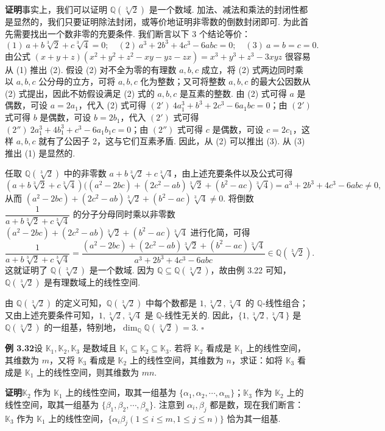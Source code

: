 \documentclass[UTF8,12pt,a4paper,fontset=fandol]{ctexart}
\begin{document}
\noindent\textbf{证明}\quad 事实上，我们可以证明 $\mathbb{Q}(\sqrt[3]{2})$ 是一个数域. 加法、减法和乘法的封闭性都是显然的，我们只要证明除法封闭，或等价地证明非零数的倒数封闭即可. 为此首先需要找出一个数非零的充要条件. 我们断言以下 3 个结论等价：
\[
(1)\ a+b\sqrt[3]{2}+c\sqrt[3]{4}=0;\quad
(2)\ a^3+2b^3+4c^3-6abc=0;\quad
(3)\ a=b=c=0.
\]
由公式 $(x+y+z)(x^2+y^2+z^2-xy-yz-zx)=x^3+y^3+z^3-3xyz$ 很容易从 (1) 推出 (2). 假设 (2) 对不全为零的有理数 $a,b,c$ 成立，将 (2) 式两边同时乘以 $a,b,c$ 公分母的立方，可将 $a,b,c$ 化为整数；又可将整数 $a,b,c$ 的最大公因数从 (2) 式提出，因此不妨假设满足 (2) 式的 $a,b,c$ 是互素的整数. 由 (2) 式可得 $a$ 是偶数，可设 $a=2a_1$，代入 (2) 式可得 $(2')\ 4a_1^3+b^3+2c^3-6a_1bc=0$；由 $(2')$ 式可得 $b$ 是偶数，可设 $b=2b_1$，代入 $(2')$ 式可得 $(2'')\ 2a_1^3+4b_1^3+c^3-6a_1b_1c=0$；由 $(2'')$ 式可得 $c$ 是偶数，可设 $c=2c_1$，这样 $a,b,c$ 就有了公因子 2，这与它们互素矛盾. 因此，从 (2) 可以推出 (3). 从 (3) 推出 (1) 是显然的.

任取 $\mathbb{Q}(\sqrt[3]{2})$ 中的非零数 $a+b\sqrt[3]{2}+c\sqrt[3]{4}$，由上述充要条件以及公式可得
\[
(a+b\sqrt[3]{2}+c\sqrt[3]{4})\bigl((a^2-2bc)+(2c^2-ab)\sqrt[3]{2}+(b^2-ac)\sqrt[3]{4}\bigr)
=a^3+2b^3+4c^3-6abc\ne 0,
\]
从而 $(a^2-2bc)+(2c^2-ab)\sqrt[3]{2}+(b^2-ac)\sqrt[3]{4}\ne 0$. 将倒数 $\dfrac{1}{a+b\sqrt[3]{2}+c\sqrt[3]{4}}$ 的分子分母同时乘以非零数 $(a^2-2bc)+(2c^2-ab)\sqrt[3]{2}+(b^2-ac)\sqrt[3]{4}$ 进行化简，可得
\[
\frac{1}{a+b\sqrt[3]{2}+c\sqrt[3]{4}}
=\frac{(a^2-2bc)+(2c^2-ab)\sqrt[3]{2}+(b^2-ac)\sqrt[3]{4}}{a^3+2b^3+4c^3-6abc}
\in\mathbb{Q}(\sqrt[3]{2}).
\]
这就证明了 $\mathbb{Q}(\sqrt[3]{2})$ 是一个数域. 因为 $\mathbb{Q}\subseteq\mathbb{Q}(\sqrt[3]{2})$，故由例 3.22 可知，$\mathbb{Q}(\sqrt[3]{2})$ 是有理数域上的线性空间.

由 $\mathbb{Q}(\sqrt[3]{2})$ 的定义可知，$\mathbb{Q}(\sqrt[3]{2})$ 中每个数都是 $1,\sqrt[3]{2},\sqrt[3]{4}$ 的 $\mathbb{Q}$-线性组合；又由上述充要条件可知，$1,\sqrt[3]{2},\sqrt[3]{4}$ 是 $\mathbb{Q}$-线性无关的. 因此，$\{1,\sqrt[3]{2},\sqrt[3]{4}\}$ 是 $\mathbb{Q}(\sqrt[3]{2})$ 的一组基，特别地，$\dim_{\mathbb{Q}}\mathbb{Q}(\sqrt[3]{2})=3$. $\square$

\noindent\textbf{例 3.32}\quad 设 $\mathbb{K}_1,\mathbb{K}_2,\mathbb{K}_3$ 是数域且 $\mathbb{K}_1\subseteq\mathbb{K}_2\subseteq\mathbb{K}_3$. 若将 $\mathbb{K}_2$ 看成是 $\mathbb{K}_1$ 上的线性空间，其维数为 $m$，又将 $\mathbb{K}_3$ 看成是 $\mathbb{K}_2$ 上的线性空间，其维数为 $n$，求证：如将 $\mathbb{K}_3$ 看成是 $\mathbb{K}_1$ 上的线性空间，则其维数为 $mn$.

\noindent\textbf{证明}\quad $\mathbb{K}_2$ 作为 $\mathbb{K}_1$ 上的线性空间，取其一组基为 $\{\alpha_1,\alpha_2,\cdots,\alpha_m\}$；$\mathbb{K}_3$ 作为 $\mathbb{K}_2$ 上的线性空间，取其一组基为 $\{\beta_1,\beta_2,\cdots,\beta_n\}$. 注意到 $\alpha_i,\beta_j$ 都是数，现在我们断言：$\mathbb{K}_3$ 作为 $\mathbb{K}_1$ 上的线性空间，$\{\alpha_i\beta_j(1\le i\le m,1\le j\le n)\}$ 恰为其一组基.
\end{document}
